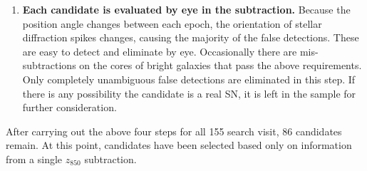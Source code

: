 \begin{enumerate}
\item {\bf Each candidate is evaluated by eye in the subtraction.}
Because the position angle changes between each epoch, the orientation
of stellar diffraction spikes changes, causing the majority of the
false detections. These are easy to detect and eliminate by
eye. Occasionally there are mis-subtractions on the cores of bright
galaxies that pass the above requirements. Only completely unambiguous
false detections are eliminated in this step. If there is any
possibility the candidate is a real SN, it is left in the sample for
further consideration.
\end{enumerate}

After carrying out the above four steps for all 155 search visit, 86
candidates remain. At this point, candidates have been selected based
only on information from a single $z_{850}$ subtraction.
